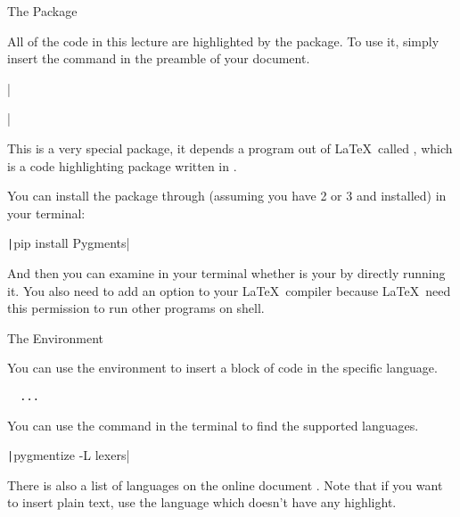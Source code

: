 \begin{frame}[fragile]{The  Package}

All of the code in this lecture are highlighted by the  package. To use it, simply insert the command in the preamble of your document.

\begin{command}
\LC|\usepackage{minted}|
\end{command}

This is a very special package, it depends a program out of \LaTeX\, called , which is a code highlighting package written in . \medskip

You can install the package through  (assuming you have  2 or 3 and  installed) in your terminal:

\begin{command}
\texttt|pip install Pygments|
\end{command}

And then you can examine in your terminal whether  is your  by directly running it. You also need to add an option  to your \LaTeX\ compiler because \LaTeX\ need this permission to run other programs on shell.

\end{frame}

\begin{frame}[fragile]{The  Environment}

You can use the  environment to insert a block of code in the specific language.

\begin{command}
\begin{LCL}
\begin{verbatim}
  ...
\end{verbatim}
\end{LCL}
\end{command}

You can use the command in the terminal to find the supported languages. 
\begin{command}
\texttt|pygmentize -L lexers|
\end{command}

There is also a list of languages on the online document . Note that if you want to insert plain text, use the  language which doesn't have any highlight. \medskip

\end{frame}

